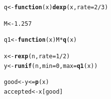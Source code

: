 \documentclass[11pt, a4paper]{article}\usepackage[]{graphicx}\usepackage[]{xcolor}
\makeatletter
\newcommand{\hlnum}[1]{\textcolor[rgb]{0.686,0.059,0.569}{#1}}%
\newcommand{\hlopt}[1]{\textcolor[rgb]{0,0,0}{#1}}%
\newcommand{\hldef}[1]{\textcolor[rgb]{0.345,0.345,0.345}{#1}}%
\newcommand{\hlkwa}[1]{\textcolor[rgb]{0.161,0.373,0.58}{\textbf{#1}}}%
\newcommand{\hlkwb}[1]{\textcolor[rgb]{0.69,0.353,0.396}{#1}}%
\newcommand{\hlkwc}[1]{\textcolor[rgb]{0.333,0.667,0.333}{#1}}%
\newcommand{\hlkwd}[1]{\textcolor[rgb]{0.737,0.353,0.396}{\textbf{#1}}}%
\newenvironment{kframe}{%
 \def\at@end@of@kframe{}%
 \ifinner\ifhmode%
  \def\at@end@of@kframe{\end{minipage}}%
  \begin{minipage}{\columnwidth}%
 \fi\fi%
 \def\FrameCommand##1{\hskip\@totalleftmargin \hskip-\fboxsep
 \colorbox{shadecolor}{##1}\hskip-\fboxsep
     \hskip-\linewidth \hskip-\@totalleftmargin \hskip\columnwidth}%
 \MakeFramed {\advance\hsize-\width
   \@totalleftmargin\z@ \linewidth\hsize
   \@setminipage}}%
 {\par\unskip\endMakeFramed%
 \at@end@of@kframe}
\newenvironment{knitrout}{}{} %
\makeatother
\begin{document}
\begin{knitrout}
\color{fgcolor}\begin{kframe}
\begin{alltt}
\hldef{q} \hlkwb{<-} \hlkwa{function}\hldef{(}\hlkwc{x}\hldef{)} \hlkwd{dexp}\hldef{(x,} \hlkwc{rate} \hldef{=} \hlnum{2}\hlopt{/}\hlnum{3}\hldef{)}
\end{alltt}
\end{kframe}
\end{knitrout}

\begin{knitrout}
\color{fgcolor}\begin{kframe}
\begin{alltt}
\hldef{M} \hlkwb{<-} \hlnum{1.257}
\end{alltt}
\end{kframe}
\end{knitrout}

\begin{knitrout}
\color{fgcolor}\begin{kframe}
\begin{alltt}
\hldef{q1} \hlkwb{<-} \hlkwa{function}\hldef{(}\hlkwc{x}\hldef{) M} \hlopt{*} \hlkwd{q}\hldef{(x)}
\end{alltt}
\end{kframe}
\end{knitrout}

\begin{knitrout}
\color{fgcolor}\begin{kframe}
\begin{alltt}
\hldef{x} \hlkwb{<-} \hlkwd{rexp}\hldef{(n,} \hlkwc{rate} \hldef{=} \hlnum{1}\hlopt{/}\hlnum{2}\hldef{)}
\hldef{y} \hlkwb{<-} \hlkwd{runif}\hldef{(n,} \hlkwc{min} \hldef{=} \hlnum{0}\hldef{,} \hlkwc{max} \hldef{=} \hlkwd{q1}\hldef{(x))}
\end{alltt}
\end{kframe}
\end{knitrout}

\begin{knitrout}
\color{fgcolor}\begin{kframe}
\begin{alltt}
\hldef{good} \hlkwb{<-} \hldef{y} \hlopt{<=} \hlkwd{p}\hldef{(x)}
\hldef{accepted} \hlkwb{<-} \hldef{x[good]}
\end{alltt}
\end{kframe}
\end{knitrout}
\end{document}
